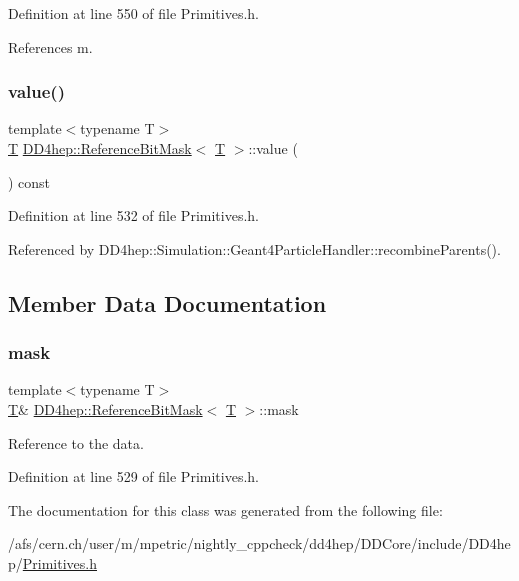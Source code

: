Definition at line 550 of file Primitives.\+h.



References m.

\hypertarget{class_d_d4hep_1_1_reference_bit_mask_ae0efa1aa20beec300c612de6bb70ff66}{}\label{class_d_d4hep_1_1_reference_bit_mask_ae0efa1aa20beec300c612de6bb70ff66} 
\subsubsection{\texorpdfstring{value()}{value()}}
{\footnotesize\ttfamily template$<$typename T$>$ \\
\hyperlink{class_t}{T} \hyperlink{class_d_d4hep_1_1_reference_bit_mask}{D\+D4hep\+::\+Reference\+Bit\+Mask}$<$ \hyperlink{class_t}{T} $>$\+::value (\begin{DoxyParamCaption}{ }\end{DoxyParamCaption}) const\hspace{0.3cm}{\ttfamily [inline]}}



Definition at line 532 of file Primitives.\+h.



Referenced by D\+D4hep\+::\+Simulation\+::\+Geant4\+Particle\+Handler\+::recombine\+Parents().



\subsection{Member Data Documentation}
\hypertarget{class_d_d4hep_1_1_reference_bit_mask_aa770625de709649071feac5dc7ac1fc1}{}\label{class_d_d4hep_1_1_reference_bit_mask_aa770625de709649071feac5dc7ac1fc1} 
\subsubsection{\texorpdfstring{mask}{mask}}
{\footnotesize\ttfamily template$<$typename T$>$ \\
\hyperlink{class_t}{T}\& \hyperlink{class_d_d4hep_1_1_reference_bit_mask}{D\+D4hep\+::\+Reference\+Bit\+Mask}$<$ \hyperlink{class_t}{T} $>$\+::mask}



Reference to the data. 



Definition at line 529 of file Primitives.\+h.



The documentation for this class was generated from the following file\+:\begin{DoxyCompactItemize}
\item 
/afs/cern.\+ch/user/m/mpetric/nightly\+\_\+cppcheck/dd4hep/\+D\+D\+Core/include/\+D\+D4hep/\hyperlink{_primitives_8h}{Primitives.\+h}\end{DoxyCompactItemize}
